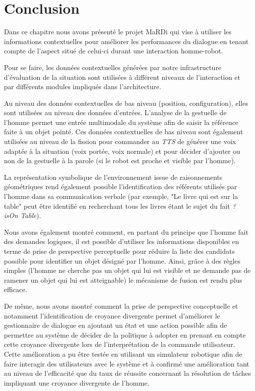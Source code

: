 \documentclass[a4paper,11pt,twoside]{StyleThese}
\begin{document}


\section{Conclusion}
\label{sec:chap3conclusion}
Dans ce chapitre nous avons présenté le projet MaRDi qui vise à utiliser les informations contextuelles pour améliorer les performances du dialogue en tenant compte de l'aspect situé de celui-ci durant une interaction homme-robot.

Pour se faire, les données contextuelles générées par notre infrastructure d'évaluation de la situation sont utilisées à différent niveaux de l'interaction et par différents modules impliqués dans l'architecture.

Au niveau des données contextuelles de bas niveau (position, configuration), elles sont utilisées au niveau des données d'entrées. L'analyse de la gestuelle de l'homme permet une entrée multimodale du système afin de saisir la référence faite à un objet pointé. Ces données contextuelles de bas niveau sont également utilisées au niveau de la fission pour commander au \textit{TTS} de générer une voix adaptée à la situation (voix portée, voix normale) et pour décider d'ajouter ou non de la gestuelle à la parole (si le robot est proche et visible par l'homme).

La représentation symbolique de l'environnement issue de raisonnements géométriques rend également possible l'identification des référents utilisés par l'homme dans sa communication verbale (par exemple, "Le livre qui est sur la table" peut être identifié en recherchant tous les livres étant le sujet du fait \textit{? isOn Table}).

Nous avons également montré comment, en partant du principe que l'homme fait des demandes logiques, il est possible d'utiliser les informations disponibles en terme de prise de perspective perceptuelle pour réduire la liste des candidats possible pour identifier un objet désigné par l'homme.
Ainsi, grâce à des règles simples (l'homme ne cherche pas un objet qui lui est visible et ne demande pas de ramener un objet qui lui est atteignable) le mécanisme de fusion est rendu plus efficace.

De même, nous avons montré comment la prise de perspective conceptuelle et notamment l'identification de croyance divergente permet d'améliorer le gestionnaire de dialogue en ajoutant un état et une action possible afin de permettre au système de décider de la politique à adopter en prenant en compte cette croyance divergente lors de l'interprétation de la commande utilisateur.
Cette amélioration a pu être testée en utilisant un simulateur robotique afin de faire interagir des utilisateurs avec le système et à confirmé une amélioration tant au niveau de l'efficacité que du taux de réussite concernant la résolution de tâches impliquant une croyance divergente de l'homme.
\end{document}
